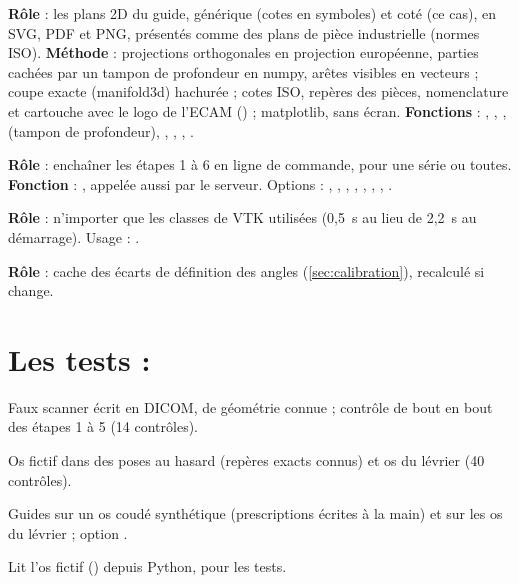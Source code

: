 \textbf{Rôle} : les plans 2D du guide, générique (cotes en symboles) et coté (ce cas), en SVG, PDF et PNG, présentés
comme des plans de pièce industrielle (normes ISO). \textbf{Méthode} : projections orthogonales en projection
européenne, parties cachées par un tampon de profondeur en numpy, arêtes visibles en vecteurs ; coupe exacte
(manifold3d) hachurée ; cotes ISO, repères des pièces, nomenclature et cartouche avec le logo de l'ECAM
() ; matplotlib, sans écran. \textbf{Fonctions} : , ,
,  (tampon de profondeur), , ,
, .

\textbf{Rôle} : enchaîner les étapes 1 à 6 en ligne de commande, pour une série ou toutes. \textbf{Fonction} :
, appelée aussi par le serveur. Options : , , ,
, , , , .

\textbf{Rôle} : n'importer que les classes de VTK utilisées (0,5~s au lieu de 2,2~s au démarrage). Usage :
.

\textbf{Rôle} : cache des écarts de définition des angles (\cref{sec:calibration}), recalculé si
 change.

\section{Les tests : \texorpdfstring{}{code\_source/tests/}}

 Faux scanner écrit en DICOM, de géométrie connue ; contrôle de bout en bout des
étapes 1 à 5 (14 contrôles).

 Os fictif dans des poses au hasard (repères exacts connus) et os du lévrier
(40 contrôles).

 Guides sur un os coudé synthétique (prescriptions écrites à la main) et sur les os du
lévrier ; option .

 Lit l'os fictif () depuis Python, pour les tests.

